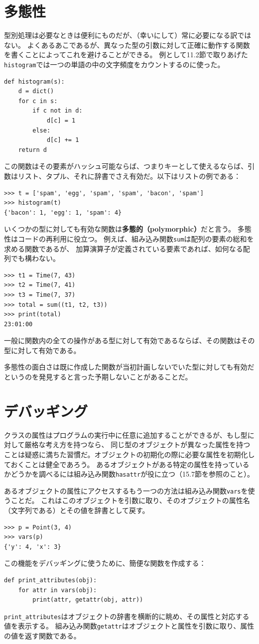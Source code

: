 \documentclass[a4j,12pt,makeidx]{jbook}
\begin{document}
\section{多態性}
型別処理は必要なときは便利にものだが、（幸いにして）常に必要になる訳ではない。
よくあるあこであるが、異なった型の引数に対して正確に動作する関数を書くことによってこれを避けることができる。
例として11.2節で取りあげた{\tt histogram}では一つの単語の中の文字頻度をカウントするのに使った。
\begin{verbatim}
def histogram(s):
    d = dict()
    for c in s:
        if c not in d:
            d[c] = 1
        else:
            d[c] += 1
    return d
\end{verbatim}
この関数はその要素がハッシュ可能ならば、つまりキーとして使えるならば、引数はリスト、タプル、それに辞書でさえ有効だ。以下はリストの例である：
\begin{verbatim}
>>> t = ['spam', 'egg', 'spam', 'spam', 'bacon', 'spam']
>>> histogram(t)
{'bacon': 1, 'egg': 1, 'spam': 4}
\end{verbatim} \par
いくつかの型に対しても有効な関数は{\bf 多態的（polymorphic）}だと言う。
多態性はコードの再利用に役立つ。
例えば、組み込み関数{\tt sum}は配列の要素の総和を求める関数であるが、
加算演算子が定義されている要素であれば、如何なる配列でも構わない。
\begin{verbatim}
>>> t1 = Time(7, 43)
>>> t2 = Time(7, 41)
>>> t3 = Time(7, 37)
>>> total = sum((t1, t2, t3))
>>> print(total)
23:01:00
\end{verbatim} 
一般に関数内の全ての操作がある型に対して有効であるならば、その関数はその型に対して有効である。\par
多態性の面白さは既に作成した関数が当初計画しないでいた型に対しても有効だというのを発見すると言った予期しないことがあることだ。
%
\section{デバッギング}
クラスの属性はプログラムの実行中に任意に追加することができるが、もし型に対して厳格な考え方を持つなら、
同じ型のオブジェクトが異なった属性を持つことは疑惑に満ちた習慣だ。オブジェクトの初期化の際に必要な属性を初期化しておくことは健全であろう。
あるオブジェクトがある特定の属性を持っているかどうかを調べるには組み込み関数{\tt hasattr}が役に立つ（15.7節を参照のこと）。\par
あるオブジェクトの属性にアクセスするもう一つの方法は組み込み関数{\tt vars}を使うことだ。
これはこのオブジェクトを引数に取り、そのオブジェクトの属性名（文字列である）とその値を辞書として戻す。
\begin{verbatim}
>>> p = Point(3, 4)
>>> vars(p)
{'y': 4, 'x': 3}
\end{verbatim}
この機能をデバッギングに使うために、簡便な関数を作成する：
\begin{verbatim}
def print_attributes(obj):
    for attr in vars(obj):
        print(attr, getattr(obj, attr))
\end{verbatim}
{\tt print\_attributes}はオブジェクトの辞書を横断的に眺め、その属性と対応する値を表示する。
組み込み関数{\tt getattr}はオブジェクトと属性を引数に取り、属性の値を返す関数である。
%
\end{document}
